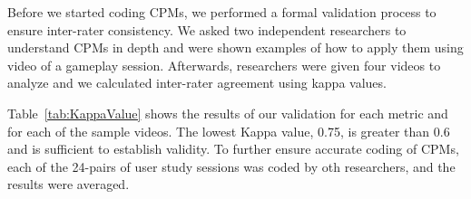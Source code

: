 Before we started coding CPMs, we performed a formal validation process to ensure inter-rater consistency. We asked two independent researchers to understand CPMs in depth and were shown examples of how to apply them using video of a gameplay session. Afterwards, researchers were given four videos to analyze and we calculated inter-rater agreement using kappa values\cite{Kappa1,Kappa2}. 

Table~\ref{tab:KappaValue} shows the results of our validation for each metric and for each of the sample videos. The lowest Kappa value, 0.75, is greater than 0.6 and is sufficient to establish validity. To further ensure accurate coding of CPMs, each of the 24-pairs of user study sessions was coded by oth researchers, and the results were averaged. 



